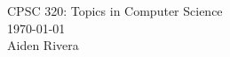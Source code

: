 \documentclass[12pt]{article}
\theoremstyle{definition}
\newtheorem{defn}{Definition}
\newtheorem{note}{Note}
\begin{document}
\setcounter{section}{0}

\begingroup
    \centering
    \LARGE CPSC 320: Topics in Computer Science\\[0.5em]
    \large \today\\[0.5em]
    \large Aiden Rivera\par
\endgroup

%
%
%
%
\end{document}
